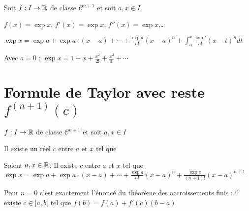 \begin{frame}

\begin{theoreme}
Soit $f : I\to\mathbb{R}$ de classe $\mathcal{C}^{n+1}$ et soit $a,x \in I$
\end{theoreme}
%  

\pause 

\begin{exemple}
$f(x)=\exp x$, 
\pause 
$f'(x)=\exp x$, $f''(x)=\exp x$,\ldots 

\pause

$\exp x=\exp a+\exp a \cdot (x-a)+\cdots+\frac{\exp a}{n!}(x-a)^n+\int_a^x\frac{\exp t}{n!}(x-t)^ndt$

\pause

Avec $a=0$ : $\exp x=1+x+\frac{x^2}{2!}+\frac{x^3}{3!}+\cdots $
\end{exemple}



\end{frame}




\section{Formule de Taylor avec reste $f^{(n+1)}(c)$}

\begin{frame}
\begin{theoreme}
$f : I\to\mathbb{R}$ de classe $\mathcal{C}^{n+1}$ et soit $a,x \in I$

Il existe un réel $c$ entre $a$ et $x$ tel que 
\end{theoreme}

\pause


\begin{exemple}
Soient $a,x \in\mathbb{R}$. Il existe $c$ entre $a$ et $x$ tel que 
$\exp x=\exp a+\exp a \cdot (x-a)+\cdots+\frac{\exp a}{n!}(x-a)^n+\frac{\exp c}{(n+1)!}(x-a)^{n+1}$  
\end{exemple}

\pause

\begin{remarque}
Pour $n=0$ c'est exactement l'énoncé du théorème des accroissements finis :
\pause
il existe $c\in]a,b[$ tel que $f(b)=f(a)+f'(c)(b-a)$
\end{remarque}

\end{frame}


